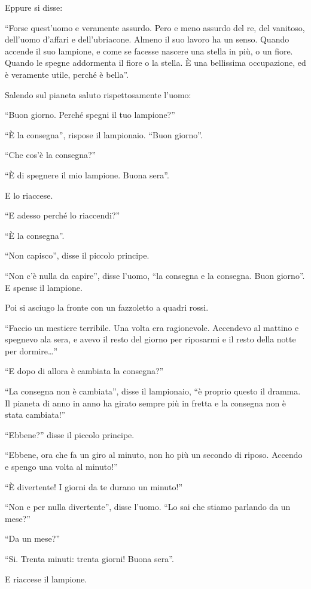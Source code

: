 \documentclass[11pt]{scrbook}
\begin{document}
Eppure si disse:

``Forse quest'uomo e veramente assurdo. Pero e meno assurdo del re, del
vanitoso, dell'uomo d'affari e dell'ubriacone. Almeno il suo lavoro ha
un senso. Quando accende il suo lampione, e come se facesse nascere una
stella in più, o un fiore. Quando le spegne addormenta il fiore o la
stella. È una bellissima occupazione, ed è veramente utile, perché è
bella''.

Salendo sul pianeta saluto rispettosamente l'uomo:

``Buon giorno. Perché spegni il tuo lampione?''

``È la consegna'', rispose il lampionaio. ``Buon giorno''.

``Che cos'è la consegna?''

``È di spegnere il mio lampione. Buona sera''.

E lo riaccese.

``E adesso perché lo riaccendi?''

``È la consegna''.

``Non capisco'', disse il piccolo principe.

``Non c'è nulla da capire'', disse l'uomo, ``la consegna e la consegna.
Buon giorno''. E spense il lampione.

Poi si asciugo la fronte con un fazzoletto a quadri rossi.

``Faccio un mestiere terribile. Una volta era ragionevole. Accendevo al
mattino e spegnevo ala sera, e avevo il resto del giorno per riposarmi e
il resto della notte per dormire\ldots{}''

``E dopo di allora è cambiata la consegna?''

``La consegna non è cambiata'', disse il lampionaio, ``è proprio questo
il dramma. Il pianeta di anno in anno ha girato sempre più in fretta e
la consegna non è stata cambiata!''

``Ebbene?'' disse il piccolo principe.

``Ebbene, ora che fa un giro al minuto, non ho più un secondo di riposo.
Accendo e spengo una volta al minuto!''

``È divertente! I giorni da te durano un minuto!''

``Non e per nulla divertente'', disse l'uomo. ``Lo sai che stiamo
parlando da un mese?''

``Da un mese?''

``Si. Trenta minuti: trenta giorni! Buona sera''.

E riaccese il lampione.
\end{document}

